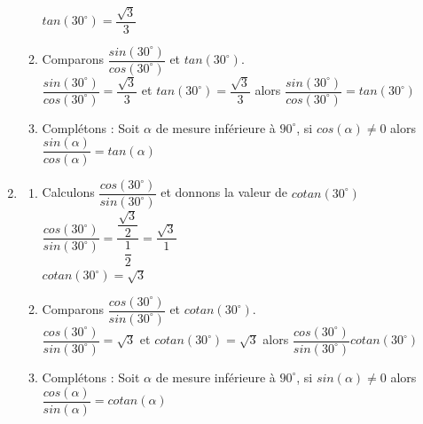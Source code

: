 \begin{multicols*}{2}
\begin{enumerate}
\begin{enumerate}
  			$ tan(30^\circ )=\dfrac{\sqrt{3}}{3} $
  			\item Comparons $ \dfrac{sin(30^\circ)}{cos(30^\circ)}   $ et $ tan(30^\circ ) $.\\
  			$ \dfrac{sin(30^\circ)}{cos(30^\circ)}= \dfrac{\sqrt{3}}{3}$ et
  			$ tan(30^\circ )=\dfrac{\sqrt{3}}{3} $ alors $ \dfrac{sin(30^\circ)}{cos(30^\circ)}=  tan(30^\circ )  $
  			\item Complétons : \og Soit $ \alpha $ de mesure inférieure à $ 90^\circ $, si $ cos(\alpha)\neq 0  $ alors $ \dfrac{sin(\alpha)}{cos(\alpha)} =tan(\alpha ) $ \fg{}
  		\end{enumerate}
  		\item \begin{enumerate} \item Calculons $ \dfrac{cos(30^\circ)}{sin(30^\circ)}  $ et donnons la valeur de $ cotan(30^\circ ) $ \\ 
  			$ \dfrac{cos(30^\circ)}{sin(30^\circ)}= \dfrac{\dfrac{\sqrt{3}}{2}}{\dfrac{1}{2}}=\dfrac{\sqrt{3}}{1}$ \\ 
  			$ cotan(30^\circ )= \sqrt{3}  $
  			\item Comparons $ \dfrac{cos(30^\circ)}{sin(30^\circ)}   $ et $ cotan(30^\circ ) $.\\
  			$ \dfrac{cos(30^\circ)}{sin(30^\circ)} = \sqrt{3} $ et 
  			$ cotan(30^\circ )= \sqrt{3}  $ alors 	$ \dfrac{cos(30^\circ)}{sin(30^\circ)}  cotan(30^\circ )  $
  			\item Complétons : \og Soit $ \alpha $ de mesure inférieure à $ 90^\circ $, si $ sin(\alpha)\neq 0  $ alors $ \dfrac{cos(\alpha)}{sin(\alpha)} =cotan(\alpha ) $ \fg{}
  		\end{enumerate}
  	\end{enumerate}
\end{multicols*}
